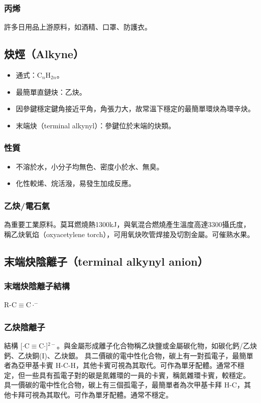 \documentclass[a4paper,12pt]{report}
\begin{document}
\begin{itemize}
\subsubsection{丙烯}
許多日用品上游原料，如酒精、口罩、防護衣。
\subsection{炔烴（Alkyne）}
\begin{itemize}
\item 通式：\( \text{C}_n\text{H}_{2n} \)。
\item 最簡單直鏈炔：乙炔。
\item 因參鍵穩定鍵角接近平角，角張力大，故常溫下穩定的最簡單環炔為環辛炔。
\item 末端炔（terminal alkynyl）：參鍵位於末端的炔類。
\end{itemize}
\subsubsection{性質}
\begin{itemize}
\item 不溶於水，小分子均無色、密度小於水、無臭。
\item 化性較烯、烷活潑，易發生加成反應。
\end{itemize}
\subsubsection{乙炔/電石氣}
為重要工業原料。莫耳燃燒熱1300kJ，與氧混合燃燒產生溫度高達3300攝氏度，稱乙炔氧焰（oxyacetylene torch），可用氧炔吹管焊接及切割金屬。可催熟水果。
\subsection{末端炔陰離子（terminal alkynyl anion）}
\subsubsection{末端炔陰離子結構}
R-C$\equiv$C$\cdot^-$
\subsubsection{乙炔陰離子}
結構 [$\cdot$C$\equiv$C$\cdot$]$^{2-}$。與金屬形成離子化合物稱乙炔鹽或金屬碳化物，如碳化鈣/乙炔鈣、乙炔銅(I)、乙炔銀。
具二價碳的電中性化合物，碳上有一對孤電子，最簡單者為亞甲基卡賓 H-C-H，其他卡賓可視為其取代。可作為單牙配體。通常不穩定，但一些具有孤電子對的碳是氮雜環的一員的卡賓，稱氮雜環卡賓，較穩定。
具一價碳的電中性化合物，碳上有三個孤電子，最簡單者為次甲基卡拜 H-C，其他卡拜可視為其取代。可作為單牙配體。通常不穩定。

\end{itemize}
\end{document}

